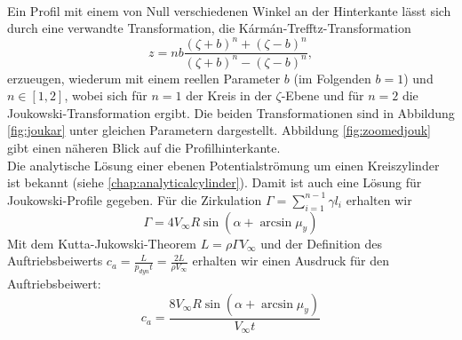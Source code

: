 \\
Ein Profil mit einem von Null verschiedenen Winkel an der Hinterkante lässt sich durch eine verwandte Transformation, die Kármán-Trefftz-Transformation
\begin{equation}
z=nb{\frac {(\zeta +b)^{n}+(\zeta -b)^{n}}{(\zeta +b)^{n}-(\zeta -b)^{n}}},
\end{equation}
erzueugen, wiederum mit einem reellen Parameter $b$ (im Folgenden $b=1$) und $n \in [1,2]$, wobei sich für $n=1$ der Kreis in der $\zeta$-Ebene und für $n=2$ die Joukowski-Transformation ergibt. Die beiden Transformationen sind in Abbildung \ref{fig:joukar} unter gleichen Parametern dargestellt. Abbildung \ref{fig:zoomedjouk} gibt einen näheren Blick auf die Profilhinterkante. \\
Die analytische Lösung einer ebenen Potentialströmung um einen Kreiszylinder ist bekannt (siehe \ref{chap:analyticalcylinder}). Damit ist auch eine Lösung für Joukowski-Profile gegeben. Für die Zirkulation $\Gamma = \sum_{i=1}^{n-1} \gamma l_i$ erhalten wir
\begin{equation}
\Gamma = 4  V_{\infty} R \sin{\left(\alpha + \arcsin \mu_y \right)}
\end{equation}
Mit dem Kutta-Jukowski-Theorem $L = \rho \Gamma V_{\infty}$ und der Definition des Auftriebsbeiwerts $c_a = \tfrac{L}{p_{dyn}t} = \tfrac{2L}{\rho V_{\infty}}$ erhalten wir einen Ausdruck für den Auftriebsbeiwert:
\begin{equation}
c_a = \frac{8  V_{\infty} R \sin{\left(\alpha + \arcsin \mu_y \right)}}{V_{\infty}t}
\end{equation} 

